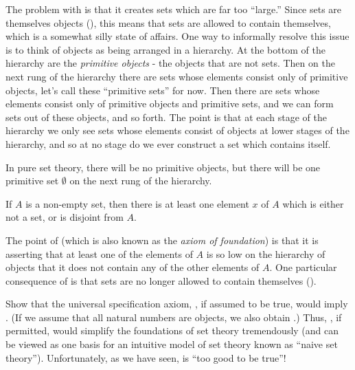 \begin{note}
  The problem with  is that it creates sets which are far too ``large.''
  Since sets are themselves objects (), this means that sets are allowed to contain themselves, which is a somewhat silly state of affairs.
  One way to informally resolve this issue is to think of objects as being arranged in a hierarchy.
  At the bottom of the hierarchy are the \emph{primitive objects} - the objects that are not sets.
  Then on the next rung of the hierarchy there are sets whose elements consist only of primitive objects, let's call these ``primitive sets'' for now.
  Then there are sets whose elements consist only of primitive objects and primitive sets, and we can form sets out of these objects, and so forth.
  The point is that at each stage of the hierarchy we only see sets whose elements consist of objects at lower stages of the hierarchy, and so at no stage do we ever construct a set which contains itself.
\end{note}

\begin{note}
  In pure set theory, there will be no primitive objects, but there will be one primitive set \(\emptyset\) on the next rung of the hierarchy.
\end{note}

\begin{ax}[Regularity]\label{i:3.9}
  If \(A\) is a non-empty set, then there is at least one element \(x\) of \(A\) which is either not a set, or is disjoint from \(A\).
\end{ax}

\begin{note}
  The point of  (which is also known as the \emph{axiom of foundation}) is that it is asserting that at least one of the elements of \(A\) is so low on the hierarchy of objects that it does not contain any of the other elements of \(A\).
  One particular consequence of  is that sets are no longer allowed to contain themselves ().
\end{note}

\exercisesection

\begin{ex}\label{i:ex:3.2.1}
  Show that the universal specification axiom, , if assumed to be true, would imply .
  (If we assume that all natural numbers are objects, we also obtain .)
  Thus, , if permitted, would simplify the foundations of set theory tremendously (and can be viewed as one basis for an intuitive model of set theory known as ``naive set theory'').
  Unfortunately, as we have seen,  is ``too good to be true''!
\end{ex}

